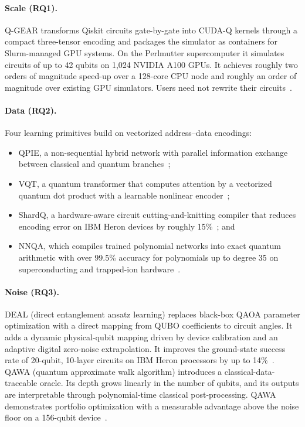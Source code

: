 \documentclass{report}
\theoremstyle{plain}
\theoremstyle{definition}
\theoremstyle{remark}
\begin{document}
\paragraph{Scale (RQ1).}
Q-GEAR transforms Qiskit circuits gate-by-gate into CUDA-Q kernels through a compact three-tensor encoding and packages the simulator as containers for Slurm-managed GPU systems. On the Perlmutter supercomputer it simulates circuits of up to 42 qubits on 1,024 NVIDIA A100 GPUs. It achieves roughly two orders of magnitude speed-up over a 128-core CPU node and roughly an order of magnitude over existing GPU simulators. Users need not rewrite their circuits~\cite{guo2025qgear}.

\paragraph{Data (RQ2).}
Four learning primitives build on vectorized address--data encodings:
\begin{itemize}
\item QPIE, a non-sequential hybrid network with parallel information exchange between classical and quantum branches~\cite{guo2025qpie};
\item VQT, a quantum transformer that computes attention by a vectorized quantum dot product with a learnable nonlinear encoder~\cite{guo2025vqt};
\item ShardQ, a hardware-aware circuit cutting-and-knitting compiler that reduces encoding error on IBM Heron devices by roughly 15\%~\cite{guo2025shardq}; and
\item NNQA, which compiles trained polynomial networks into exact quantum arithmetic with over 99.5\% accuracy for polynomials up to degree 35 on superconducting and trapped-ion hardware~\cite{guo2026nnqa}.
\end{itemize}

\paragraph{Noise (RQ3).}
DEAL (direct entanglement ansatz learning) replaces black-box QAOA parameter optimization with a direct mapping from QUBO coefficients to circuit angles. It adds a dynamic physical-qubit mapping driven by device calibration and an adaptive digital zero-noise extrapolation. It improves the ground-state success rate of 20-qubit, 10-layer circuits on IBM Heron processors by up to 14\%~\cite{guo2025deal}. QAWA (quantum approximate walk algorithm) introduces a classical-data-traceable oracle. Its depth grows linearly in the number of qubits, and its outputs are interpretable through polynomial-time classical post-processing. QAWA demonstrates portfolio optimization with a measurable advantage above the noise floor on a 156-qubit device~\cite{guo2025qawa}.
\end{document}
